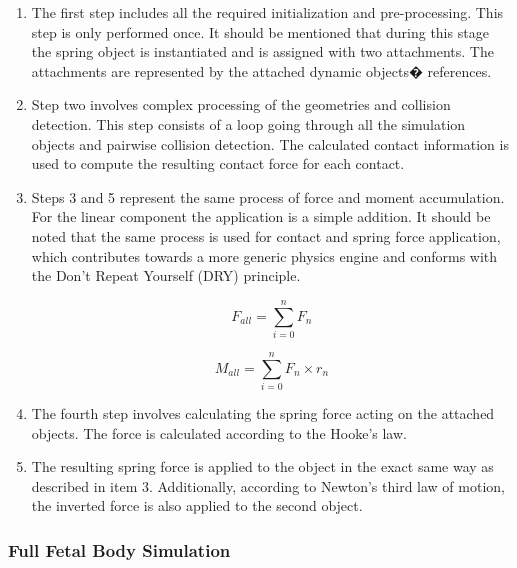 \begin{enumerate}

  \item The first step includes all the required initialization and pre-processing. This step is only performed once. It should be mentioned that during this stage the spring object is instantiated and is assigned with two attachments. The attachments are represented by the attached dynamic objects�  references.

  \item Step two involves complex processing of the geometries and collision detection. This step consists of a loop going through all the simulation objects and pairwise collision detection. The calculated contact information is used to compute the resulting contact force for each contact.

  \item Steps 3 and 5 represent the same process of force and moment accumulation. For the linear component the application is a simple addition. It should be noted that the same process is used for contact and spring force application, which contributes towards a more generic physics engine and conforms with the Don’t Repeat Yourself (DRY) principle.

  \begin{equation}
  \label{eq-force-sum}
  F_{all} = \sum_{i=0}^{n}F_{n}
  \end{equation}

  \begin{equation}
  \label{eq-moments-sum}
  M_{all} = \sum_{i=0}^{n}F_{n} \times  r_{n}
  \end{equation}


  \item The fourth step involves calculating the spring force acting on the attached objects. The force is calculated according to the Hooke’s law.

  \item The resulting spring force is applied to the object in the exact same way as described in item 3. Additionally, according to Newton’s third law of motion, the inverted force is also applied to the second object.

\end{enumerate}


\subsubsection{Full Fetal Body Simulation}

